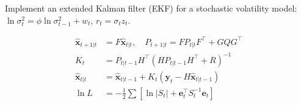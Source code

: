 \begin{exercise}
Implement an extended Kalman filter (EKF) for a stochastic volatility model: $\ln\sigma_t^2 = \phi\ln\sigma_{t-1}^2+w_t$, $r_t=\sigma_t z_t$.
\end{exercise}

\begin{keyformulas}
\begin{align*}
\hat{\bm{x}}_{t+1|t} &= F\hat{\bm{x}}_{t|t}, \quad P_{t+1|t}=FP_{t|t}F^\top+GQG^\top \\
K_t &= P_{t|t-1}H^\top(HP_{t|t-1}H^\top+R)^{-1} \\
\hat{\bm{x}}_{t|t} &= \hat{\bm{x}}_{t|t-1}+K_t(\bm{y}_t-H\hat{\bm{x}}_{t|t-1}) \\
\ln L &= -\tfrac{1}{2}\sum[\ln|S_t|+\bm{e}_t^\top S_t^{-1}\bm{e}_t]
\end{align*}
\end{keyformulas}
